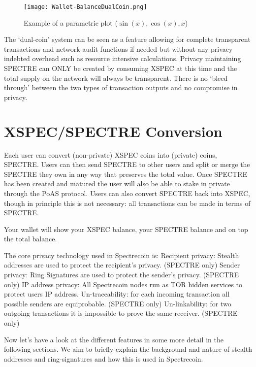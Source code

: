 \begin{figure}[h]
	\caption{Example of a parametric plot ($\sin (x), \cos(x), x$)}
	\centering
	\texttt{[image: Wallet-BalanceDualCoin.png]}
\end{figure}



The ‘dual-coin’ system can be seen as a feature allowing for complete
transparent transactions and network audit functions if needed but
without any privacy indebted overhead such as resource intensive
calculations. Privacy maintaining SPECTRE can ONLY be created by
consuming XSPEC at this time and the total supply on the network
will always be transparent. There is no ‘bleed through’ between the
two types of transaction outputs and no compromise in privacy.



\section{XSPEC/SPECTRE Conversion}
Each user can convert (non-private) XSPEC coins into (private) coins, SPECTRE.
Users can then send SPECTRE to other users and split or merge the SPECTRE they
own in any way that preserves the total value. Once SPECTRE has been created
and matured the user will also be able to stake in private through the PoAS
protocol. Users can also convert SPECTRE back into XSPEC, though in principle
this is not necessary: all transactions can be made in terms of SPECTRE.



Your wallet will show your XSPEC balance, your SPECTRE balance and on top the
total balance.



The core privacy technology used in Spectrecoin is: Recipient privacy: Stealth
addresses are used to protect the recipient’s privacy. (SPECTRE only) Sender
privacy: Ring Signatures are used to protect the sender’s privacy. (SPECTRE
only) IP address privacy: All Spectrecoin nodes run as TOR hidden services to
protect users IP address. Un-traceability: for each incoming transaction all
possible senders are equiprobable. (SPECTRE only) Un-linkability: for two
outgoing transactions it is impossible to prove the same receiver. (SPECTRE
only)



Now let’s have a look at the different features in some more detail in the
following sections. We aim to briefly explain the background and nature of
stealth addresses and ring-signatures and how this is used in Spectrecoin.
